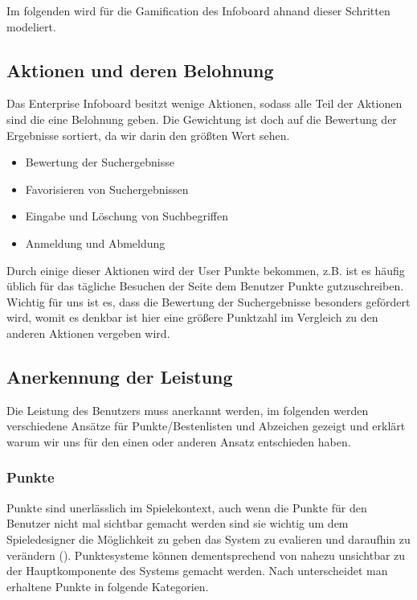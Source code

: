 \documentclass[12pt,twoside]{book}
\begin{document}
Im folgenden wird für die Gamification des Infoboard ahnand dieser Schritten modeliert.

\subsection{Aktionen und deren Belohnung}

Das Enterprise Infoboard besitzt wenige Aktionen, sodass alle Teil der Aktionen sind die eine Belohnung geben. Die Gewichtung ist doch auf die Bewertung der Ergebnisse sortiert, da wir darin den größten Wert sehen.

\begin{itemize}
  \item Bewertung der Suchergebnisse
  \item Favorisieren von Suchergebnissen
  \item Eingabe und Löschung von Suchbegriffen
  \item Anmeldung und Abmeldung
\end{itemize}

Durch einige dieser Aktionen wird der User Punkte bekommen, z.B. ist es häufig üblich für das tägliche Besuchen der Seite dem Benutzer Punkte gutzuschreiben. Wichtig für uns ist es, dass die Bewertung der Suchergebnisse besonders gefördert wird, womit es denkbar ist hier eine größere Punktzahl im Vergleich zu den anderen Aktionen vergeben wird.

\subsection{Anerkennung der Leistung}

Die Leistung des Benutzers muss anerkannt werden, im folgenden werden verschiedene Ansätze für Punkte/Bestenlisten und Abzeichen gezeigt und erklärt warum wir uns für den einen oder anderen Ansatz entschieden haben.

\subsubsection{Punkte}
Punkte sind unerlässlich im Spielekontext, auch wenn die Punkte für den Benutzer nicht mal sichtbar gemacht werden sind sie wichtig um dem Spieledesigner die Möglichkeit zu geben das System zu evalieren und daraufhin zu verändern (\citep{zichermann2011gamification}). Punktesysteme können dementsprechend von nahezu unsichtbar zu der Hauptkomponente des Systems gemacht werden. Nach \citep{zichermann2011gamification} unterscheidet man erhaltene Punkte in folgende Kategorien.
\end{document}
